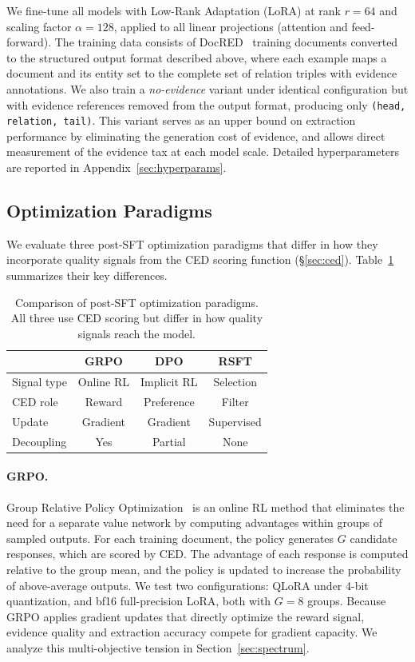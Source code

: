 We fine-tune all models with Low-Rank Adaptation (LoRA) \citep{hu2022lora} at rank $r{=}64$ and scaling factor $\alpha{=}128$, applied to all linear projections (attention and feed-forward). The training data consists of DocRED~\citep{yao2019docred} training documents converted to the structured output format described above, where each example maps a document and its entity set to the complete set of relation triples with evidence annotations. We also train a \emph{no-evidence} variant under identical configuration but with evidence references removed from the output format, producing only \texttt{(head, relation, tail)}. This variant serves as an upper bound on extraction performance by eliminating the generation cost of evidence, and allows direct measurement of the evidence tax at each model scale. Detailed hyperparameters are reported in Appendix~\ref{sec:hyperparams}.


\subsection{Optimization Paradigms}
\label{sec:paradigms}

We evaluate three post-SFT optimization paradigms that differ in how they incorporate quality signals from the CED scoring function (\S\ref{sec:ced}). Table~\ref{tab:paradigm_comparison} summarizes their key differences.

\begin{table}[t]
\centering
\caption{Comparison of post-SFT optimization paradigms. All three use CED scoring but differ in how quality signals reach the model.}
\label{tab:paradigm_comparison}
\small
\begin{tabular}{lccc}
\toprule
& \textbf{GRPO} & \textbf{DPO} & \textbf{RSFT} \\
\midrule
Signal type & Online RL & Implicit RL & Selection \\
CED role & Reward & Preference & Filter \\
Update & Gradient & Gradient & Supervised \\
Decoupling & Yes & Partial & None \\
\bottomrule
\end{tabular}
\end{table}

\paragraph{GRPO.}
Group Relative Policy Optimization~\citep{shao2024deepseekmath} is an online RL method that eliminates the need for a separate value network by computing advantages within groups of sampled outputs. For each training document, the policy generates $G$ candidate responses, which are scored by CED. The advantage of each response is computed relative to the group mean, and the policy is updated to increase the probability of above-average outputs. We test two configurations: QLoRA \citep{dettmers2023qlora} under 4-bit quantization, and bf16 full-precision LoRA, both with $G{=}8$ groups. Because GRPO applies gradient updates that directly optimize the reward signal, evidence quality and extraction accuracy compete for gradient capacity. We analyze this multi-objective tension in Section~\ref{sec:spectrum}.

